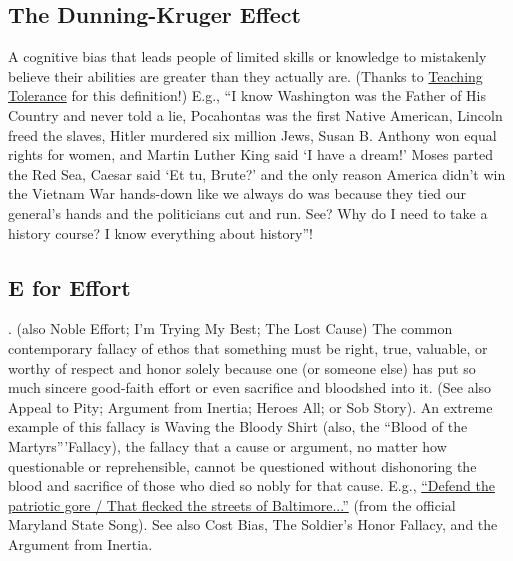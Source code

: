 \documentclass[10pt,a4paper,british]{article}
\begin{document}
\begin{multicols}{2}
	\subsection{The Dunning{-}Kruger Effect} A cognitive bias that leads people
	of limited skills or knowledge to mistakenly believe their abilities are
	greater than they actually are. (Thanks to
	\href{https://www.tolerance.org/magazine/fall-2017/speaking-of-digital-literacy}{Teaching
	Tolerance} for this definition!)  E.g., ``I know Washington was the Father
	of His Country and never told a lie, Pocahontas was the first Native
	American, Lincoln freed the slaves, Hitler murdered six million Jews, Susan
	B. Anthony won equal rights for women, and Martin Luther King said `I have
	a dream!'  Moses parted the Red Sea, Caesar said `Et tu, Brute?' and the
	only reason America didn't win the Vietnam War hands{-}down like we always
	do was because they tied our general's hands and the politicians cut and
	run. See?  Why do I need to take a history course? I know everything about
	history''!

	\subsection{E for Effort}. (also Noble Effort; I'm Trying My Best; The Lost
	Cause) The common contemporary fallacy of ethos that something must be
	right, true, valuable, or worthy of respect and honor solely because one
	(or someone else) has put so much sincere good{-}faith effort or even
	sacrifice and bloodshed into it. (See also Appeal to Pity; Argument from
	Inertia; Heroes All; or Sob Story).  An extreme example of this fallacy is
	Waving the Bloody Shirt (also, the ``Blood of the Martyrs'''Fallacy), the
	fallacy that a cause or argument, no matter how questionable or
	reprehensible, cannot be questioned without dishonoring the blood and
	sacrifice of those who died so nobly for that cause. E.g.,
	\href{https://en.wikipedia.org/wiki/Maryland,_My_Maryland#Lyrics}{``Defend
	the patriotic gore / That flecked the streets of Baltimore...''} (from the
	official Maryland State Song). See also Cost Bias, The Soldier's Honor
	Fallacy, and the Argument from Inertia.


\end{multicols}
\end{document}
